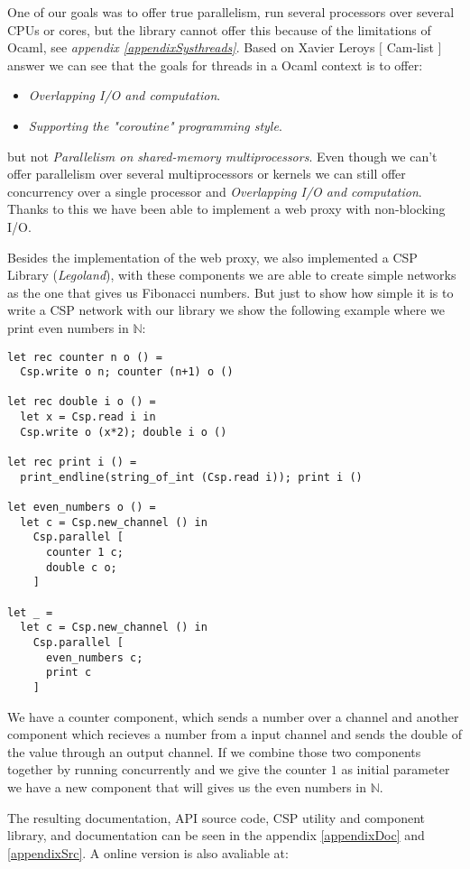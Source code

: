 \documentclass[a4paper,12pt]{article}
\begin{document}
One of our goals was to offer true parallelism, run several processors
over several CPUs or cores, but the library cannot offer this because of the
limitations of Ocaml, see {\it appendix \ref{appendixSysthreads}}. Based on
Xavier Leroys $[$ Cam-list $]$ answer we can see that the goals for threads in a
Ocaml context is to offer:
\begin{itemize}
 \item {\it Overlapping I/O and computation}.
 \item {\it Supporting the "coroutine" programming style}.
\end{itemize}
but not {\it Parallelism on shared-memory multiprocessors}. Even though we can't
offer parallelism over several multiprocessors or kernels we can still offer
concurrency over a single processor and {\it Overlapping I/O and computation}.
Thanks to this we have been able to implement a web proxy with non-blocking I/O.

Besides the implementation of the web proxy, we also implemented a CSP Library
({\it Legoland\cite{vintercsp}}), with these components we are able to create
simple networks as the one that gives us Fibonacci numbers. But just to show how
simple it is to write a CSP network with our library we show the following example
where we print even numbers in $\mathbb{N}$:
\newpage
\begin{verbatim}
let rec counter n o () =
  Csp.write o n; counter (n+1) o ()

let rec double i o () =
  let x = Csp.read i in
  Csp.write o (x*2); double i o ()

let rec print i () =
  print_endline(string_of_int (Csp.read i)); print i ()

let even_numbers o () =
  let c = Csp.new_channel () in
    Csp.parallel [
      counter 1 c;
      double c o;
    ]

let _ =
  let c = Csp.new_channel () in
    Csp.parallel [
      even_numbers c;
      print c
    ]
\end{verbatim}
We have a counter component, which sends a number over a channel and another
component which recieves a number from a input channel and sends the
double of the value through an output channel. If we combine those two
components together by running concurrently and we give the counter $1$ as
initial parameter we have a new component that will gives us the even numbers in
$\mathbb{N}$.

The resulting documentation, API source code, CSP utility and component library,
and documentation can be seen in the appendix \ref{appendixDoc} and
\ref{appendixSrc}. A online version is also avaliable at:
\end{document}
